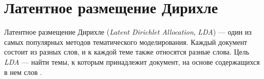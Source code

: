 \section{Латентное размещение Дирихле}

Латентное размещение Дирихле (\textit{Latent Dirichlet Allocation}, \textit{LDA}) --- один из самых популярных методов тематического моделирования. Каждый документ состоит из разных слов, и к каждой теме также относятся разные слова. Цель \textit{LDA} --- найти темы, к которым принадлежит документ, на основе содержащихся в нем слов \cite{bib_8}. 








